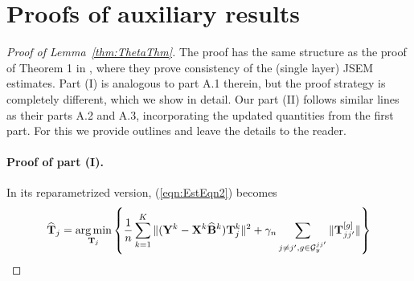 \section{Proofs of auxiliary results}

\begin{proof}[Proof of Lemma~\ref{thm:ThetaThm}]
The proof has the same structure as the proof of Theorem 1 in \cite{MaMichailidis15}, where they prove consistency of the (single layer) JSEM estimates. Part (I) is analogous to part A.1 therein, but the proof strategy is completely different, which we show in detail. Our part (II) follows similar lines as their parts A.2 and A.3, incorporating the updated quantities from the first part. For this we provide outlines and leave the details to the reader.

\paragraph{Proof of part (I).}
%
In its reparametrized version, (\ref{eqn:EstEqn2}) becomes
%
\begin{align}
\widehat {{\mathbf{T}}}_j = \operatorname*{arg\,min}_{{\mathbf{T}}_j} \left\{ \frac{1}{n} \sum_{k=1}^K \| ({\mathbf{Y}}^k - {\mathbf{X}}^k \widehat {{\mathbf{B}}}^k) {\mathbf{T}}_j^k \|^2 + \gamma_n \sum_{j \neq j', g \in {\cal{G}}_y^{jj'}} \| {\mathbf{T}}_{jj'}^{[g]} \| \right\}
\end{align}

\end{proof}
